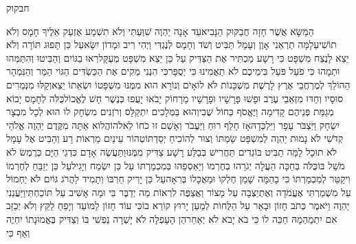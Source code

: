 \documentclass[../main/main.tex]{subfiles}
\begin{document}
\Incipit{}חבקוק\par
\vspace{\afterchapskip}
\RTLmulticolcolumns
\begin{multicols}{\ncols}
הַמַּשָּׂא אֲשֶׁר חָזָה חֲבַקּוּק הַנָּבִיא\PreVerseSpace{}עַד אָנָה יַהְוֶה שִׁוַּעְתִּי וְלֹא תִשְׁמָע אֶזְעַק אֵלֶיךָ חָמָס וְלֹא תוֹשִׁיעַ\PreVerseSpace{}לָמָּה תַרְאֵנִי אָוֶן וְעָמָל תַּבִּיט וְשֹׁד וְחָמָס לְנֶגְדִּי וַיְהִי רִיב וּמָדוֹן יִשָּׂא\PreVerseSpace{}עַל כֵּן תָּפוּג תּוֹרָה וְלֹא יֵצֵא לָנֶצַח מִשְׁפָּט כִּי רָשָׁע מַכְתִּיר אֶת הַצַּדִּיק עַל כֵּן יֵצֵא מִשְׁפָּט מְעֻקָּל\PreVerseSpace{}רְאוּ בַגּוֹיִם וְהַבִּיטוּ וְהִתַּמְּהוּ וּתְמָהוּ\SubEnd{} כִּי פֹעַל פֹּעֵל בִּימֵיכֶם לֹא תַאֲמִינוּ כִּי יְסֻפָּר\PreVerseSpace{}כִּי הִנְנִי מֵקִים אֶת הַכַּשְׂדִּים הַגּוֹי הַמַּר וְהַנִּמְהָר הַהוֹלֵךְ לְמֶרְחֲבֵי אֶרֶץ לָרֶשֶׁת מִשְׁכָּנוֹת לֹּא לוֹ\PreVerseSpace{}אָיֹם וְנוֹרָא הוּא מִמֶּנּוּ מִשְׁפָּטוֹ וּשְׂאֵתוֹ יֵצֵא\PreVerseSpace{}וְקַלּוּ מִנְּמֵרִים סוּסָיו וְחַדּוּ מִזְּאֵבֵי עֶרֶב וּפָשׁוּ פָּרָשָׁיו וּפָרָשָׁיו מֵרָחוֹק יָבֹאוּ יָעֻפוּ כְּנֶשֶׁר חָשׁ לֶאֱכוֹל\PreVerseSpace{}כֻּלֹּה לְחָמָס יָבוֹא מְגַמַּת פְּנֵיהֶם קָדִימָה וַיֶּאֱסֹף כַּחוֹל שֶׁבִי\PreVerseSpace{}וְהוּא בַּמְּלָכִים יִתְקַלָּס וְרֹזְנִים מִשְׂחָק לוֹ הוּא לְכָל מִבְצָר יִשְׂחָק וַיִּצְבֹּר עָפָר וַיִּלְכְּדָהּ\PreVerseSpace{}אָז חָלַף רוּחַ וַיַּעֲבֹר וְאָשֵׁם זוּ כֹחוֹ לֵאלֹהוֹ\PreVerseSpace{}הֲלוֹא אַתָּה מִקֶּדֶם יַהְוֶה אֱלֹהַי קְדֹשִׁי לֹא נָמוּת יַהְוֶה לְמִשְׁפָּט שַׂמְתּוֹ וְצוּר לְהוֹכִיחַ יְסַדְתּוֹ\PreVerseSpace{}טְהוֹר עֵינַיִם מֵרְאוֹת רָע וְהַבִּיט אֶל עָמָל לֹא תוּכָל לָמָּה תַבִּיט בּוֹגְדִים תַּחֲרִישׁ בְּבַלַּע רָשָׁע צַדִּיק מִמֶּנּוּ\PreVerseSpace{}וַתַּעֲשֶׂה אָדָם כִּדְגֵי הַיָּם כְּרֶמֶשׂ לֹא מֹשֵׁל בּוֹ\PreVerseSpace{}כֻּלֹּה בְּחַכָּה הֵעֲלָה יְגֹרֵהוּ בְחֶרְמוֹ וְיַאַסְפֵהוּ בְּמִכְמַרְתּוֹ עַל כֵּן יִשְׂמַח וְיָגִיל\PreVerseSpace{}עַל כֵּן יְזַבֵּחַ לְחֶרְמוֹ וִיקַטֵּר לְמִכְמַרְתּוֹ כִּי בָהֵמָּה שָׁמֵן חֶלְקוֹ וּמַאֲכָלוֹ בְּרִאָה\PreVerseSpace{}עַל\SubEnd{} כֵּן יָרִיק חַרְבּוֹ\SubEnd{} וְתָמִיד לַהֲרֹג גּוֹיִם לֹא יַחְמוֹל \ClosedSection{}עַל מִשְׁמַרְתִּי אֶעֱמֹדָה וְאֶתְיַצְּבָה עַל מָצוֹר וַאֲצַפֶּה לִרְאוֹת מַה יְדַבֶּר בִּי וּמָה אָשִׁיב עַל תּוֹכַחְתִּי\PreVerseSpace{}וַיַּעֲנֵנִי יַהְוֶה וַיֹּאמֶר כְּתֹב חָזוֹן וּבָאֵר עַל הַלֻּחוֹת לְמַעַן יָרוּץ קוֹרֵא בוֹ\PreVerseSpace{}כִּי עוֹד חָזוֹן לַמּוֹעֵד וְיָפֵחַ לַקֵּץ וְלֹא יְכַזֵּב אִם יִתְמַהְמָהּ חַכֵּה לוֹ כִּי בֹא יָבֹא לֹא יְאַחֵר\PreVerseSpace{}הֵן הָעָפְלָה\SubEnd{} לֹא יָשְׁרָה נַפְשִׁי\SubEnd{} בּוֹ וְצַדִּיק בֶּאֱמוּנָתוֹ יִחְיֶה \ClosedSection{}וְאַף כִּי 
\end{multicols}
\end{document}
